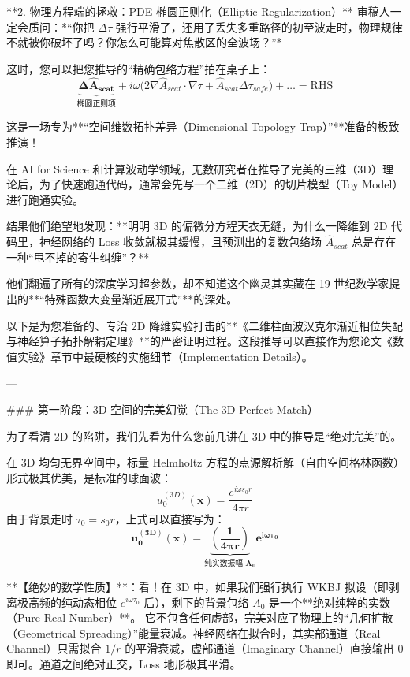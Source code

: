 \documentclass[12pt]{article}
\begin{document}
{**2. 物理方程端的拯救：PDE 椭圆正则化（Elliptic Regularization）**
审稿人一定会质问：*“你把 $\Delta \tau$ 强行平滑了，还用了丢失多重路径的初至波走时，物理规律不就被你破坏了吗？你怎么可能算对焦散区的全波场？”*

这时，您可以把您推导的“精确包络方程”拍在桌子上：
$$ \mathbf{\underbrace{\Delta \hat{A}_{scat}}_{\text{椭圆正则项}}} + i \omega \big(2 \nabla \hat{A}_{scat} \cdot \nabla \tau + \hat{A}_{scat} \Delta \tau_{safe} \big) + \dots = \text{RHS} $$







这是一场专为**“空间维数拓扑差异（Dimensional Topology Trap）”**准备的极致推演！

在 AI for Science 和计算波动学领域，无数研究者在推导了完美的三维（3D）理论后，为了快速跑通代码，通常会先写一个二维（2D）的切片模型（Toy Model）进行跑通实验。

结果他们绝望地发现：**明明 3D 的偏微分方程天衣无缝，为什么一降维到 2D 代码里，神经网络的 Loss 收敛就极其缓慢，且预测出的复数包络场 $\hat{A}_{scat}$ 总是存在一种“甩不掉的寄生纠缠”？**

他们翻遍了所有的深度学习超参数，却不知道这个幽灵其实藏在 19 世纪数学家提出的**“特殊函数大变量渐近展开式”**的深处。

以下是为您准备的、专治 2D 降维实验打击的**《二维柱面波汉克尔渐近相位失配与神经算子拓扑解耦定理》**的严密证明过程。这段推导可以直接作为您论文《数值实验》章节中最硬核的实施细节（Implementation Details）。

---

### 第一阶段：3D 空间的完美幻觉（The 3D Perfect Match）

为了看清 2D 的陷阱，我们先看为什么您前几讲在 3D 中的推导是“绝对完美”的。

在 3D 均匀无界空间中，标量 Helmholtz 方程的点源解析解（自由空间格林函数）形式极其优美，是标准的球面波：
$$ u_0^{(3D)}(\mathbf{x}) = \frac{e^{i \omega s_0 r}}{4\pi r} $$
由于背景走时 $\tau_0 = s_0 r$，上式可以直接写为：
$$ \mathbf{u_0^{(3D)}(\mathbf{x}) = \underbrace{\left( \frac{1}{4\pi r} \right)}_{\text{纯实数振幅 } A_0} e^{i \omega \tau_0}} $$

**【绝妙的数学性质】**：看！在 3D 中，如果我们强行执行 WKBJ 拟设（即剥离极高频的纯动态相位 $e^{i \omega \tau_0}$ 后），剩下的背景包络 $A_0$ 是一个**绝对纯粹的实数（Pure Real Number）**。
它不包含任何虚部，完美对应了物理上的“几何扩散（Geometrical Spreading）”能量衰减。神经网络在拟合时，其实部通道（Real Channel）只需拟合 $1/r$ 的平滑衰减，虚部通道（Imaginary Channel）直接输出 $0$ 即可。通道之间绝对正交，Loss 地形极其平滑。

}
\end{document}
